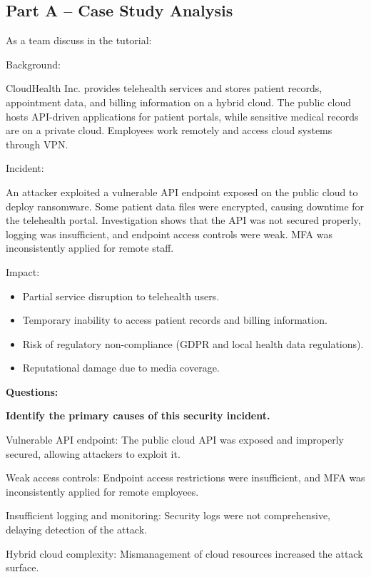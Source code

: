 \subsection{Part A – Case Study Analysis}

\indent 

As a team discuss in the tutorial:

Background:

CloudHealth Inc. provides telehealth services and stores patient records, appointment data, and billing information on a hybrid cloud. The public cloud hosts API-driven applications for patient portals, while sensitive medical records are on a private cloud. Employees work remotely and access cloud systems through VPN.

Incident:

An attacker exploited a vulnerable API endpoint exposed on the public cloud to deploy ransomware. Some patient data files were encrypted, causing downtime for the telehealth portal. Investigation shows that the API was not secured properly, logging was insufficient, and endpoint access controls were weak. MFA was inconsistently applied for remote staff.

Impact:

\begin{itemize}
    \item Partial service disruption to telehealth users.
    \item Temporary inability to access patient records and billing information.
    \item Risk of regulatory non-compliance (GDPR and local health data regulations).
    \item Reputational damage due to media coverage.
\end{itemize}

\bigskip

\noindent\textbf{Questions:}

\noindent\textbf{Identify the primary causes of this security incident.}

Vulnerable API endpoint: The public cloud API was exposed and improperly secured, allowing attackers to exploit it.

Weak access controls: Endpoint access restrictions were insufficient, and MFA was inconsistently applied for remote employees.

Insufficient logging and monitoring: Security logs were not comprehensive, delaying detection of the attack.

Hybrid cloud complexity: Mismanagement of cloud resources increased the attack surface.

